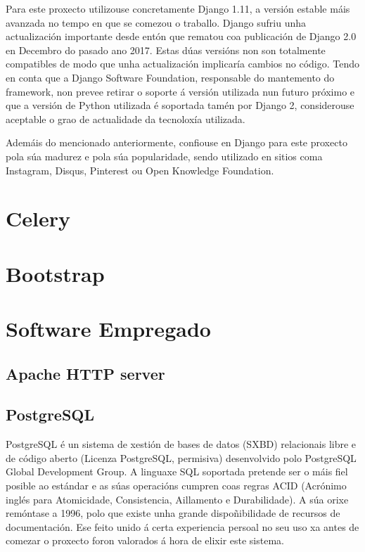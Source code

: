 Para este proxecto utilizouse concretamente Django 1.11, a versión estable máis avanzada no tempo en que se comezou o 
traballo. Django sufriu unha actualización importante desde entón que rematou coa publicación de Django 2.0 en Decembro do pasado ano 2017. Estas dúas versións non son totalmente compatibles de modo que unha actualización implicaría cambios no 
código. Tendo en conta que a Django Software Foundation, responsable do mantemento do framework, non prevee retirar o soporte á versión utilizada nun futuro próximo e que a versión de Python utilizada é soportada tamén por Django 2\cite{django2}, considerouse aceptable o grao de actualidade da tecnoloxía utilizada.    

Ademáis do mencionado anteriormente, confiouse en Django para este proxecto pola súa madurez e pola súa popularidade, sendo  utilizado en sitios coma Instagram, Disqus, Pinterest ou Open Knowledge Foundation.

\section{Celery}

\section{Bootstrap}

\section{Software Empregado}

\subsection{Apache HTTP server}

\subsection{PostgreSQL}

PostgreSQL é un sistema de xestión de bases de datos (SXBD) relacionais libre e de código aberto (Licenza PostgreSQL, permisiva) desenvolvido polo PostgreSQL Global Development Group. A linguaxe SQL soportada pretende ser o máis fiel posible ao estándar e as súas operacións cumpren coas regras ACID (Acrónimo inglés para Atomicidade, Consistencia, Aillamento e Durabilidade)\cite{postgres1}. A súa orixe remóntase a 1996, polo que existe unha grande dispoñibilidade de recursos de documentación. Ese feito unido á certa experiencia persoal no seu uso xa antes de comezar o proxecto foron valorados á hora de elixir este sistema.

